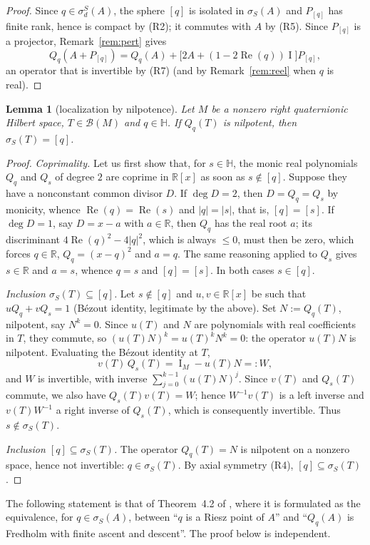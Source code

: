 \documentclass[11pt,a4paper]{article}
\theoremstyle{plain}
\newtheorem{lemma}{Lemma}[section]
\theoremstyle{remark}
\newcommand{\HH}{\mathbb H}
\newcommand{\RR}{\mathbb R}
\newcommand{\B}{\mathcal B}
\newcommand{\sS}{\sigma_S}
\newcommand{\sd}{\sigma_d^S}
\DeclareMathOperator{\Id}{I}
\newcommand{\Qq}[1]{Q_q(#1)}
\begin{document}
\begin{proof}
Since $q\in\sd(A)$, the sphere $[q]$ is isolated in $\sS(A)$ and $P_{[q]}$ has finite rank, hence is compact by (R2); it commutes with $A$ by (R5). Since $P_{[q]}$ is a projector, Remark~\ref{rem:pert} gives
\[
\Qq{A+P_{[q]}}=\Qq{A}+\big[2A+(1-2\operatorname{Re}(q))\Id\big]P_{[q]},
\]
an operator that is invertible by (R7) (and by Remark~\ref{rem:reel} when $q$ is real).
\end{proof}

\begin{lemma}[localization by nilpotence]\label{lem:loc}
Let $M$ be a nonzero right quaternionic Hilbert space, $T\in\B(M)$ and $q\in\HH$. If $Q_q(T)$ is nilpotent, then $\sS(T)=[q]$.
\end{lemma}

\begin{proof}
\emph{Coprimality.} Let us first show that, for $s\in\HH$, the monic real polynomials $Q_q$ and $Q_s$ of degree $2$ are coprime in $\RR[x]$ as soon as $s\notin[q]$. Suppose they have a nonconstant common divisor $D$. If $\deg D=2$, then $D=Q_q=Q_s$ by monicity, whence $\operatorname{Re}(q)=\operatorname{Re}(s)$ and $|q|=|s|$, that is, $[q]=[s]$. If $\deg D=1$, say $D=x-a$ with $a\in\RR$, then $Q_q$ has the real root $a$; its discriminant $4\operatorname{Re}(q)^2-4|q|^2$, which is always $\le0$, must then be zero, which forces $q\in\RR$, $Q_q=(x-q)^2$ and $a=q$. The same reasoning applied to $Q_s$ gives $s\in\RR$ and $a=s$, whence $q=s$ and $[q]=[s]$. In both cases $s\in[q]$.

\emph{Inclusion $\sS(T)\subseteq[q]$.} Let $s\notin[q]$ and $u,v\in\RR[x]$ be such that $uQ_q+vQ_s=1$ (Bézout identity, legitimate by the above). Set $N:=Q_q(T)$, nilpotent, say $N^k=0$. Since $u(T)$ and $N$ are polynomials with real coefficients in $T$, they commute, so $(u(T)N)^k=u(T)^kN^k=0$: the operator $u(T)N$ is nilpotent. Evaluating the Bézout identity at $T$,
\[
v(T)\,Q_s(T)=\Id_M-u(T)N=:W,
\]
and $W$ is invertible, with inverse $\sum_{j=0}^{k-1}(u(T)N)^j$. Since $v(T)$ and $Q_s(T)$ commute, we also have $Q_s(T)v(T)=W$; hence $W^{-1}v(T)$ is a left inverse and $v(T)W^{-1}$ a right inverse of $Q_s(T)$, which is consequently invertible. Thus $s\notin\sS(T)$.

\emph{Inclusion $[q]\subseteq\sS(T)$.} The operator $Q_q(T)=N$ is nilpotent on a nonzero space, hence not invertible: $q\in\sS(T)$. By axial symmetry (R4), $[q]\subseteq\sS(T)$.
\end{proof}
The following statement is that of Theorem~4.2 of \cite{AJ26}, where it is formulated as the equivalence, for $q\in\sS(A)$, between ``$q$ is a Riesz point of $A$'' and ``$\Qq{A}$ is Fredholm with finite ascent and descent''. The proof below is independent.
\end{document}
